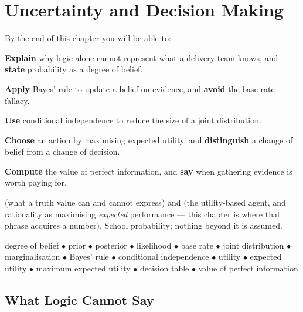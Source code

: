 \chapter{Uncertainty and Decision Making}\label{ch:uncertainty}

\begin{outcomes}
By the end of this chapter you will be able to:
\begin{tight}
  \item \textbf{Explain} why logic alone cannot represent what a delivery team
        knows, and \textbf{state} probability as a degree of belief.
  \item \textbf{Apply} Bayes' rule to update a belief on evidence, and
        \textbf{avoid} the base-rate fallacy.
  \item \textbf{Use} conditional independence to reduce the size of a joint
        distribution.
  \item \textbf{Choose} an action by maximising expected utility, and
        \textbf{distinguish} a change of belief from a change of decision.
  \item \textbf{Compute} the value of perfect information, and \textbf{say} when
        gathering evidence is worth paying for.
\end{tight}
\end{outcomes}

\begin{prereq}
 (what a truth value can and cannot express) and
 (the utility-based agent, and rationality as maximising
\emph{expected} performance --- this chapter is where that phrase acquires a
number). School probability; nothing beyond it is assumed.
\end{prereq}

\begin{keyterms}
degree of belief $\bullet$ prior $\bullet$ posterior $\bullet$ likelihood
$\bullet$ base rate $\bullet$ joint distribution $\bullet$ marginalisation
$\bullet$ Bayes' rule $\bullet$ conditional independence $\bullet$ utility
$\bullet$ expected utility $\bullet$ maximum expected utility $\bullet$ decision
table $\bullet$ value of perfect information
\end{keyterms}

\section{What Logic Cannot Say}

